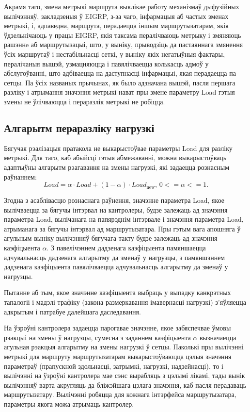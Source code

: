 Акрамя таго, змена метрыкі маршрута выклікае работу механізмаў
дыфузійных вылічэнняў, закладзеныя ў EIGRP, з-за чаго, інфармацыя
аб частых зменах метрыкі, і, адпаведна, маршрута, перадаецца
іншым маршрутызатарам, якія ўдзельнічаюць у працы EIGRP, якія таксама пералічваюць
метрыку і змяняюць рашэннe аб маршрутызацыі, што, у выніку, прыводзіць да
пастаяннага змянення ўсіх маршрутаў і нестабільнасці сеткі,
у выніку якіх негатыўныя фактары, пералічаныя вышэй, узмацняюцца
і павялічваецца колькасць адмоў у абслугоўванні, што адбіваецца на даступнасці інфармацыі, якая перадаецца па сетцы.
Па ўсіх названых прычынах, як было адзначана вышэй, пасля першага
разліку і атрымання значэння метрыкі нават пры змене параметру Load гэтыя
змены не ўлічваюцца і пераразлік метрыкі не робіцца.

\subsection{Алгарытм пераразліку нагрузкі}

Бягучая рэалізацыя пратакола не выкарыстоўвае параметры Load для разліку метрыкі. Для таго, каб абыйсці гэтыя абмежаванні, можна выкарыстоўваць
адаптыўны алгарытм рэагавання на змены нагрузкі, які задаецца рознасным раўнаннем:
\begin{equation}
    Load = \alpha \cdot Load + (1 - \alpha) \cdot Load_\text{new}\text{, } 0 <= \alpha <= 1.
\end{equation}

Згодна з асаблівасцю рознаснага раўнення, значэнне параметра Load,
якое вылічваецца за бягучы інтэрвал на кантролеры, будзе залежаць ад значэння
параметра Load, вылічанага на папярэднім інтэрвале і значэння параметра Load, атрыманага за бягучы інтэрвал ад маршрутызатара. Пры гэтым вага
апошняга ў агульным выніку вылічэнняў бягучага такту будзе залежаць ад
значэння каэфіцыента $\alpha$. З павелічэннем дадзенага каэфіцыента памяншаецца адчувальнасць дадзенага алгарытму да зменаў у нагрузцы, з памяншэннем дадзенага каэфіцыента павялічваецца адчувальнасць алгарытму
да зменаў у нагрузцы.

Пытанне аб тым, якое значэнне каэфіцыента выбраць
у выпадку канкрэтных тапалогіі і мадэлі трафіку (закона размеркавання імавернасці нагрузкі) з'яўляецца адкрытым і патрабуе далейшага даследавання.

На ўзроўні кантролера задаецца парогавае значэнне, якое забяспечвае ўмовы рэакцыі на змены ў нагрузцы, сумесна з заданнем каэфіцыента $\alpha$ вызначаецца агульная рэакцыя алгарытму на змены нагрузкі ў сетцы.
Паколькі пры вылічэнні метрыкі для маршруту маршрутызатарам выкарыстоўваюцца цэлыя значэння параметраў (прапускной здольнасці, затрымкі,
нагрузкі, надзейнасці), то і вылічэнні на ўзроўні кантролера мае сэнс
вырабляць з цэлымі лікамі, тады вынік вылічэнняў варта акругляць
да бліжэйшага цэлага значэння, каб пасля перадаваць маршрутызатару.
Вылічэнні робяцца для кожнага інтэрфейса маршрутызатара, параметры якога можа атрымаць кантролер.

